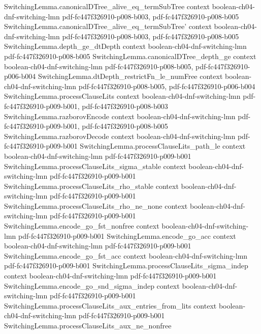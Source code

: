\begin{theorem}
  {SwitchingLemma.canonicalDTree_alive_eq_termSubTree}
  {context}
  {boolean-ch04-dnf-switching-lmn}
  {pdf-fc447f326910-p008-b003,
    pdf-fc447f326910-p008-b005}
\proofstep
  {SwitchingLemma.canonicalDTree_alive_eq_termSubTree'}
  {context}
  {boolean-ch04-dnf-switching-lmn}
  {pdf-fc447f326910-p008-b003,
    pdf-fc447f326910-p008-b005}
\proofstep
  {SwitchingLemma.depth_ge_dtDepth}
  {context}
  {boolean-ch04-dnf-switching-lmn}
  {pdf-fc447f326910-p008-b005}
\proofstep
  {SwitchingLemma.canonicalDTree_depth_ge}
  {context}
  {boolean-ch04-dnf-switching-lmn}
  {pdf-fc447f326910-p008-b005,
    pdf-fc447f326910-p006-b004}
\proofstep
  {SwitchingLemma.dtDepth_restrictFn_le_numFree}
  {context}
  {boolean-ch04-dnf-switching-lmn}
  {pdf-fc447f326910-p008-b005,
    pdf-fc447f326910-p006-b004}
\proofstep
  {SwitchingLemma.processClauseLits}
  {context}
  {boolean-ch04-dnf-switching-lmn}
  {pdf-fc447f326910-p009-b001,
    pdf-fc447f326910-p008-b003}
\proofstep
  {SwitchingLemma.razborovEncode}
  {context}
  {boolean-ch04-dnf-switching-lmn}
  {pdf-fc447f326910-p009-b001,
    pdf-fc447f326910-p008-b005}
\proofstep
  {SwitchingLemma.razborovDecode}
  {context}
  {boolean-ch04-dnf-switching-lmn}
  {pdf-fc447f326910-p009-b001}
\proofstep
  {SwitchingLemma.processClauseLits_path_le}
  {context}
  {boolean-ch04-dnf-switching-lmn}
  {pdf-fc447f326910-p009-b001}
\proofstep
  {SwitchingLemma.processClauseLits_sigma_stable}
  {context}
  {boolean-ch04-dnf-switching-lmn}
  {pdf-fc447f326910-p009-b001}
\proofstep
  {SwitchingLemma.processClauseLits_rho_stable}
  {context}
  {boolean-ch04-dnf-switching-lmn}
  {pdf-fc447f326910-p009-b001}
\proofstep
  {SwitchingLemma.processClauseLits_rho_ne_none}
  {context}
  {boolean-ch04-dnf-switching-lmn}
  {pdf-fc447f326910-p009-b001}
\proofstep
  {SwitchingLemma.encode_go_fst_nonfree}
  {context}
  {boolean-ch04-dnf-switching-lmn}
  {pdf-fc447f326910-p009-b001}
\proofstep
  {SwitchingLemma.encode_go_acc}
  {context}
  {boolean-ch04-dnf-switching-lmn}
  {pdf-fc447f326910-p009-b001}
\proofstep
  {SwitchingLemma.encode_go_fst_acc}
  {context}
  {boolean-ch04-dnf-switching-lmn}
  {pdf-fc447f326910-p009-b001}
\proofstep
  {SwitchingLemma.processClauseLits_sigma_indep}
  {context}
  {boolean-ch04-dnf-switching-lmn}
  {pdf-fc447f326910-p009-b001}
\proofstep
  {SwitchingLemma.encode_go_snd_sigma_indep}
  {context}
  {boolean-ch04-dnf-switching-lmn}
  {pdf-fc447f326910-p009-b001}
\proofstep
  {SwitchingLemma.processClauseLits_aux_entries_from_lits}
  {context}
  {boolean-ch04-dnf-switching-lmn}
  {pdf-fc447f326910-p009-b001}
\proofstep
  {SwitchingLemma.processClauseLits_aux_ne_nonfree}

\end{theorem}
